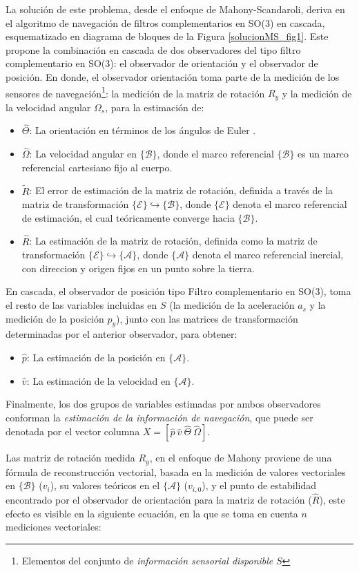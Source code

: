 \documentclass[conference]{IEEEtran}
\newcommand{\marco}[1]{\{\mathcal{#1}\}}
\begin{document}
La solución de este problema, desde el enfoque de Mahony-Scandaroli, deriva en el algoritmo de navegación de filtros complementarios en SO(3) en cascada, esquematizado en diagrama de bloques de la Figura \ref{solucionMS_fig1}. Este propone la combinación en cascada de dos observadores del tipo filtro complementario en SO(3): el observador de orientación y el observador de posición. En donde, el observador orientación toma parte de la medición de los sensores de navegación\footnote{ Elementos del conjunto de \emph{información sensorial disponible} $S$}: la medición de la matriz de rotación $R_y$ y la medición de la velocidad angular $\Omega_s$, para la estimación de:
\begin{itemize}
\item $\hat{\Theta}$: La orientación en términos de los ángulos de Euler .
\item  $\hat{\Omega}$: La velocidad angular en $\marco{B}$, donde el marco referencial $\marco{B}$ es un marco referencial cartesiano fijo al cuerpo.
\item $\tilde{R}$: El error de estimación de la matriz de rotación, definida a través de la matriz de transformación $\marco{E}\hookrightarrow\marco{B}$, donde $\marco{E}$ denota el marco referencial de estimación, el cual teóricamente converge hacia $\marco{B}$.
\item $\hat{R}$: La estimación de la matriz de rotación, definida como la matriz de transformación $ \marco{E}\hookrightarrow\marco{A}$,  donde $\marco{A}$ denota el marco referencial inercial, con direccion y origen fijos en un punto sobre la tierra.
\end{itemize}
En cascada, el observador de posición tipo Filtro complementario en SO(3), toma el resto de las variables incluidas en $S$ (la medición de la aceleración $a_s$ y la medición de la posición $p_y$), junto con las matrices de transformación determinadas por el anterior observador, para obtener:
\begin{itemize}
\item $\hat{p}$: La estimación de la posición en $\marco{A}$.
\item $\hat{v}$: La estimación de la velocidad en $\marco{A}$.
\end{itemize}
Finalmente, los dos grupos de variables estimadas por ambos observadores conforman la \emph{estimación de la información de navegación}, que puede ser denotada por el vector columna $X=[\hat{p}~\hat{v}~\hat{\Theta}~\hat{\Omega}]$.\par
Las matriz de rotación medida $R_y$, en el enfoque de Mahony proviene de una fórmula de  reconstrucción vectorial, basada en la medición de valores vectoriales en $\marco{B}$ ($v_i$), su valores teóricos en el $\marco{A}$ ($v_{i,0}$), y el punto de estabilidad encontrado por el observador de orientación para la matriz de rotación ($\hat{R}$), este efecto es visible en la siguiente ecuación, en la que se toma en cuenta $n$ mediciones vectoriales:
\end{document}
